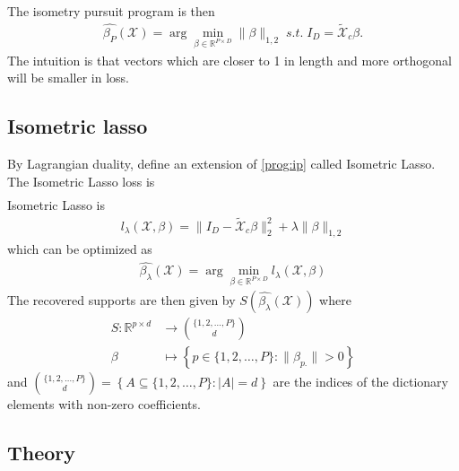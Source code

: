 The isometry pursuit program is then
\begin{align}
\label{prog:isometry_pursuit}
\hat {\beta_{P}} (\mathcal X)  = \arg \min_{\beta \in \mathbb R^{P \times D}} \| \beta \|_{1,2} \; s.t. \; I_D = \tilde{ \mathcal X}_c \beta.
\end{align}
The intuition is that vectors which are closer to 1 in length and more orthogonal will be smaller in loss.



\subsection{Isometric lasso}

By Lagrangian duality, define an extension of \ref{prog:ip} called Isometric Lasso.
The Isometric Lasso loss is
\begin{align}
\end{align}
Isometric Lasso is
\begin{align}
l_\lambda (\mathcal X, \beta) =  \|I_D -  \tilde{ \mathcal X}_c \beta\|_2^2 +  \lambda \| \beta \|_{1,2}
\end{align}
which can be optimized as
\begin{align}
\label{prog:isometric_lasso}
\hat {\beta_{\lambda}} (\mathcal X) = \arg \min_{\beta \in \mathbb R^{P \times D}} l_\lambda (\mathcal X, \beta)
\end{align}
The recovered supports are then given by $S(\hat {\beta_{\lambda}} (\mathcal X))$ where 
\begin{align}
S: \mathbb{R}^{p \times d} &\to \binom{\{1, 2, \ldots, P\}}{d} \\
\beta &\mapsto \left\{ p \in \{1, 2, \ldots, P\} :  \|\beta_{p.}\| > 0 \right\}
\end{align}
and $\binom{\{1, 2, \ldots, P\}}{d} = \left\{ A \subseteq \{1, 2, \ldots, P\} : \left|A\right| = d \right\}$ are the indices of the dictionary elements with non-zero coefficients.

\subsection{Theory}
\label{sec:theory}

